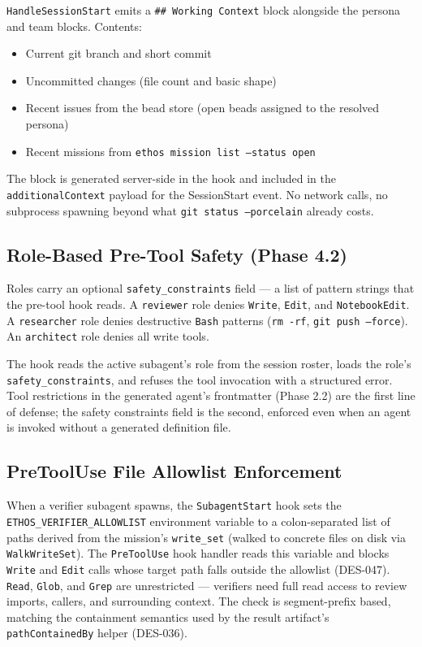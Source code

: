 \documentclass[a4paper,10pt]{article}
\newcommand{\field}[1]{\texttt{#1}}
\newcommand{\cmd}[1]{\texttt{#1}}
\begin{document}
\texttt{HandleSessionStart} emits a \texttt{\#\# Working Context}
block alongside the persona and team blocks.  Contents:

\begin{itemize}
  \item Current git branch and short commit
  \item Uncommitted changes (file count and basic shape)
  \item Recent issues from the bead store (open beads assigned to
    the resolved persona)
  \item Recent missions from \cmd{ethos mission list --status open}
\end{itemize}

The block is generated server-side in the hook and included in the
\texttt{additionalContext} payload for the SessionStart event.  No
network calls, no subprocess spawning beyond what
\texttt{git status --porcelain} already costs.

\subsection{Role-Based Pre-Tool Safety (Phase 4.2)}

Roles carry an optional \field{safety\_constraints} field --- a
list of pattern strings that the pre-tool hook reads.  A
\texttt{reviewer} role denies \texttt{Write}, \texttt{Edit}, and
\texttt{NotebookEdit}.  A \texttt{researcher} role denies
destructive \texttt{Bash} patterns (\texttt{rm -rf},
\texttt{git push --force}).  An \texttt{architect} role denies all
write tools.

The hook reads the active subagent's role from the session roster,
loads the role's \field{safety\_constraints}, and refuses the tool
invocation with a structured error.  Tool restrictions in the
generated agent's frontmatter (Phase 2.2) are the first line of
defense; the safety constraints field is the second, enforced even
when an agent is invoked without a generated definition file.

\subsection{PreToolUse File Allowlist Enforcement}

When a verifier subagent spawns, the \texttt{SubagentStart} hook
sets the \texttt{ETHOS\_VERIFIER\_ALLOWLIST} environment variable to
a colon-separated list of paths derived from the mission's
\field{write\_set} (walked to concrete files on disk via
\texttt{WalkWriteSet}).  The \texttt{PreToolUse} hook handler reads
this variable and blocks \texttt{Write} and \texttt{Edit} calls
whose target path falls outside the allowlist (DES-047).
\texttt{Read}, \texttt{Glob}, and \texttt{Grep} are unrestricted ---
verifiers need full read access to review imports, callers, and
surrounding context.  The check is segment-prefix based, matching
the containment semantics used by the result artifact's
\texttt{pathContainedBy} helper (DES-036).
\end{document}
